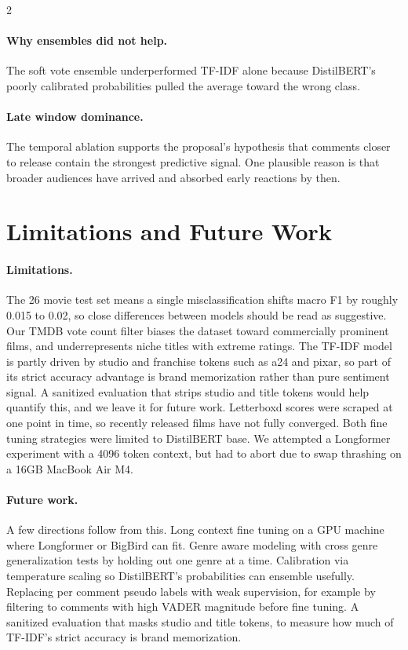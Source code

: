 \documentclass[10pt,letterpaper]{article}
\begin{document}
\begin{multicols}{2}
\paragraph{Why ensembles did not help.} The soft vote ensemble underperformed TF-IDF alone because DistilBERT's poorly calibrated probabilities pulled the average toward the wrong class.

\paragraph{Late window dominance.} The temporal ablation supports the proposal's hypothesis that comments closer to release contain the strongest predictive signal. One plausible reason is that broader audiences have arrived and absorbed early reactions by then.

\section{Limitations and Future Work}

\paragraph{Limitations.} The 26 movie test set means a single misclassification shifts macro F1 by roughly 0.015 to 0.02, so close differences between models should be read as suggestive. Our TMDB vote count filter biases the dataset toward commercially prominent films, and underrepresents niche titles with extreme ratings. The TF-IDF model is partly driven by studio and franchise tokens such as a24 and pixar, so part of its strict accuracy advantage is brand memorization rather than pure sentiment signal. A sanitized evaluation that strips studio and title tokens would help quantify this, and we leave it for future work. Letterboxd scores were scraped at one point in time, so recently released films have not fully converged. Both fine tuning strategies were limited to DistilBERT base. We attempted a Longformer experiment with a 4096 token context, but had to abort due to swap thrashing on a 16GB MacBook Air M4.

\paragraph{Future work.} A few directions follow from this. Long context fine tuning on a GPU machine where Longformer or BigBird can fit. Genre aware modeling with cross genre generalization tests by holding out one genre at a time. Calibration via temperature scaling so DistilBERT's probabilities can ensemble usefully. Replacing per comment pseudo labels with weak supervision, for example by filtering to comments with high VADER magnitude before fine tuning. A sanitized evaluation that masks studio and title tokens, to measure how much of TF-IDF's strict accuracy is brand memorization.


\end{multicols}
\end{document}
